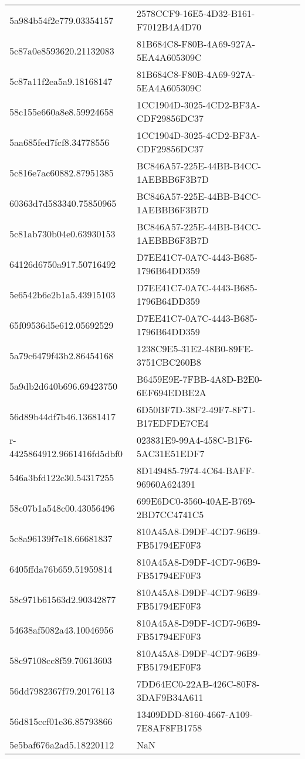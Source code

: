 \begin{tabular}{ll}
5a984b54f2e779.03354157 & 2578CCF9-16E5-4D32-B161-F7012B4A4D70 \\
5c87a0e8593620.21132083 & 81B684C8-F80B-4A69-927A-5EA4A605309C \\
5c87a11f2ea5a9.18168147 & 81B684C8-F80B-4A69-927A-5EA4A605309C \\
58c155e660a8e8.59924658 & 1CC1904D-3025-4CD2-BF3A-CDF29856DC37 \\
5aa685fed7fcf8.34778556 & 1CC1904D-3025-4CD2-BF3A-CDF29856DC37 \\
5c816e7ac60882.87951385 & BC846A57-225E-44BB-B4CC-1AEBBB6F3B7D \\
60363d7d583340.75850965 & BC846A57-225E-44BB-B4CC-1AEBBB6F3B7D \\
5c81ab730b04e0.63930153 & BC846A57-225E-44BB-B4CC-1AEBBB6F3B7D \\
64126d6750a917.50716492 & D7EE41C7-0A7C-4443-B685-1796B64DD359 \\
5e6542b6e2b1a5.43915103 & D7EE41C7-0A7C-4443-B685-1796B64DD359 \\
65f09536d5e612.05692529 & D7EE41C7-0A7C-4443-B685-1796B64DD359 \\
5a79c6479f43b2.86454168 & 1238C9E5-31E2-48B0-89FE-3751CBC260B8 \\
5a9db2d640b696.69423750 & B6459E9E-7FBB-4A8D-B2E0-6EF694EDBE2A \\
56d89b44df7b46.13681417 & 6D50BF7D-38F2-49F7-8F71-B17EDFDE7CE4 \\
r-4425864912.9661416fd5dbf0 & 023831E9-99A4-458C-B1F6-5AC31E51EDF7 \\
546a3bfd122c30.54317255 & 8D149485-7974-4C64-BAFF-96960A624391 \\
58c07b1a548c00.43056496 & 699E6DC0-3560-40AE-B769-2BD7CC4741C5 \\
5c8a96139f7e18.66681837 & 810A45A8-D9DF-4CD7-96B9-FB51794EF0F3 \\
6405ffda76b659.51959814 & 810A45A8-D9DF-4CD7-96B9-FB51794EF0F3 \\
58c971b61563d2.90342877 & 810A45A8-D9DF-4CD7-96B9-FB51794EF0F3 \\
54638af5082a43.10046956 & 810A45A8-D9DF-4CD7-96B9-FB51794EF0F3 \\
58c97108cc8f59.70613603 & 810A45A8-D9DF-4CD7-96B9-FB51794EF0F3 \\
56dd7982367f79.20176113 & 7DD64EC0-22AB-426C-80F8-3DAF9B34A611 \\
56d815ccf01e36.85793866 & 13409DDD-8160-4667-A109-7E8AF8FB1758 \\
5e5baf676a2ad5.18220112 & NaN \\

\end{tabular}
